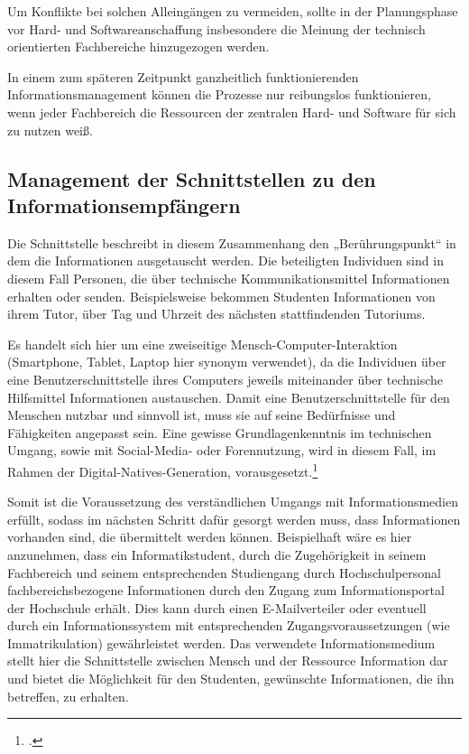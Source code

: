 Um Konflikte bei solchen \glqq Alleingängen\grqq{} zu vermeiden, sollte in der Planungsphase vor 
Hard- und Softwareanschaffung insbesondere die Meinung der technisch orientierten 
Fachbereiche hinzugezogen werden. 

In einem zum späteren Zeitpunkt ganzheitlich funktionierenden Informationsmanagement 
können die Prozesse nur reibungslos funktionieren, wenn jeder Fachbereich die Ressourcen 
der zentralen Hard- und Software für sich zu nutzen weiß.

\subsection{Management der Schnittstellen zu den Informationsempfängern}
\label{subsection_management_schnittstellen_infoempfangern}
Die Schnittstelle beschreibt in diesem Zusammenhang den „Berührungspunkt“ in dem 
die Informationen ausgetauscht werden. Die beteiligten Individuen sind in diesem Fall 
Personen, die über technische Kommunikationsmittel Informationen erhalten oder senden. 
Beispielsweise bekommen Studenten Informationen von ihrem Tutor, über Tag und Uhrzeit 
des nächsten stattfindenden Tutoriums. 

Es handelt sich hier um eine zweiseitige Mensch-Computer-Interaktion (Smartphone, Tablet, 
Laptop hier synonym verwendet), da die Individuen über eine Benutzerschnittstelle ihres 
Computers jeweils miteinander über technische Hilfsmittel Informationen austauschen.
Damit eine Benutzerschnittstelle für den Menschen nutzbar und sinnvoll ist, muss sie auf 
seine Bedürfnisse und Fähigkeiten angepasst sein. Eine gewisse Grundlagenkenntnis im 
technischen Umgang, sowie mit Social-Media- oder Forennutzung, wird in diesem Fall, 
im Rahmen der Digital-Natives-Generation, vorausgesetzt.\footcite{wikipedia_digitalnative_2015}

Somit ist die Voraussetzung des verständlichen Umgangs mit Informationsmedien erfüllt, 
sodass im nächsten Schritt dafür gesorgt werden muss, dass Informationen vorhanden sind, 
die übermittelt werden können. Beispielhaft wäre es hier anzunehmen, dass ein Informatikstudent, 
durch die Zugehörigkeit in seinem Fachbereich und seinem entsprechenden Studiengang durch 
Hochschulpersonal fachbereichsbezogene Informationen durch den Zugang zum Informationsportal 
der Hochschule erhält. Dies kann durch einen E-Mailverteiler oder eventuell durch ein 
Informationssystem mit entsprechenden Zugangsvoraussetzungen (wie Immatrikulation) gewährleistet 
werden. Das verwendete Informationsmedium stellt hier die Schnittstelle zwischen Mensch und der 
Ressource Information dar und bietet die Möglichkeit für den Studenten, gewünschte Informationen, 
die ihn betreffen, zu erhalten.

